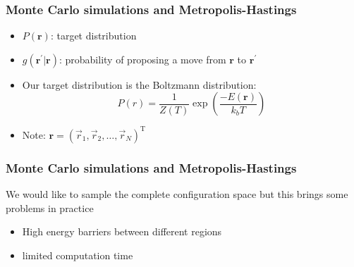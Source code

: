 \documentclass{beamer}
\begin{document}
  \begin{frame}
  	\frametitle{Monte Carlo simulations and Metropolis-Hastings}
  	\begin{itemize}
  		\item $P(\mathbf{r})$: target distribution
  		\item $g(\mathbf{r}^\prime|\mathbf{r})$: probability of proposing a move from $\mathbf{r}$ to $\mathbf{r}^\prime$
  		\item Our target distribution is the Boltzmann distribution:
  		\begin{equation}
  			P(r) = \frac{1}{Z(T)}\exp\left(\frac{-E(\mathbf{r})}{k_bT}\right)
  		\end{equation}
  		\item Note: $\mathbf{r} = (\vec{r}_1,\vec{r}_2, \ldots, \vec{r}_{N})^\text{T}$
  	\end{itemize}
  \end{frame}

	\begin{frame}
		\frametitle{Monte Carlo simulations and Metropolis-Hastings}
		We would like to sample the complete configuration space but this brings some problems in practice
		\begin{itemize}
			\item High energy barriers between different regions
			\item limited computation time
		\end{itemize}	
	\end{frame}














































\begin{frame}
  	\printbibliography[heading=bibintoc]

  \end{frame}
\end{document}
